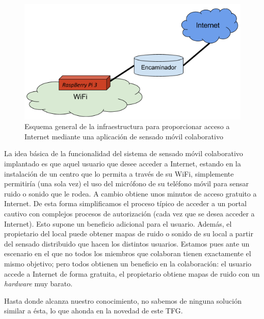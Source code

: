 \begin{figure}[!t]
\begin{center}
\includegraphics[width=0.75\linewidth]{./2_SensadoCol/Img/SystemScheme.png}
\end{center}
\caption{Esquema general de la infraestructura para proporcionar acceso a Internet mediante una aplicación de sensado móvil colaborativo}
\label{SystemScheme}
\end{figure}

La idea básica de la funcionalidad del sistema de sensado móvil colaborativo implantado es que aquel usuario que desee acceder a Internet, estando en la instalación de un centro que lo permita a través de su WiFi, simplemente permitiría (una sola vez) el uso del micrófono de su teléfono móvil para sensar ruido o sonido que le rodea. A cambio obtiene unos minutos de acceso gratuito a Internet. De esta forma simplificamos el proceso típico de acceder a un portal cautivo con complejos procesos de autorización (cada vez que se desea acceder a Internet). Esto supone un beneficio adicional para el usuario. Además, el propietario del local puede obtener mapas de ruido o sonido de su local a partir del sensado distribuido que hacen los distintos usuarios. Estamos pues ante un escenario en el que no todos los miembros que colaboran tienen exactamente el mismo objetivo; pero todos obtienen un beneficio en la colaboración: el usuario accede a Internet de forma gratuita, el propietario obtiene mapas de ruido con un \emph{hardware} muy barato.

Hasta donde alcanza nuestro conocimiento, no sabemos de ninguna solución similar a ésta, lo que ahonda en la novedad de este TFG. 